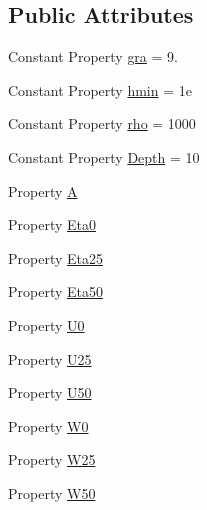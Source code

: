 \subsection*{Public Attributes}
\begin{DoxyCompactItemize}
\item 
Constant Property \hyperlink{class_nonhydrostatic_solitary_wave_a37f0468086327d90fba63bba4e2479bd}{gra} = 9.
\item 
Constant Property \hyperlink{class_nonhydrostatic_solitary_wave_aedba80f2b2bf3bb88a2dbe65acd50a8c}{hmin} = 1e
\item 
Constant Property \hyperlink{class_nonhydrostatic_solitary_wave_a37a61713a65b4f5613275f0698667743}{rho} = 1000
\item 
Constant Property \hyperlink{class_nonhydrostatic_solitary_wave_a781465fb7b097e42b93a05e9900a34fc}{Depth} = 10
\item 
Property \hyperlink{class_nonhydrostatic_solitary_wave_aa29acc0711e31c9bea232ca15aaf6bb0}{A}
\item 
Property \hyperlink{class_nonhydrostatic_solitary_wave_aacf571c090dcb2b8f3cf415b2f3c9ac5}{Eta0}
\item 
Property \hyperlink{class_nonhydrostatic_solitary_wave_a7a68533e4d5af739b62c6c492c9d734a}{Eta25}
\item 
Property \hyperlink{class_nonhydrostatic_solitary_wave_a33fb2694b0dab9bcba9ab40ce13c6592}{Eta50}
\item 
Property \hyperlink{class_nonhydrostatic_solitary_wave_a3eab97f8c42fa2ef3ed8a6c4ff6480e8}{U0}
\item 
Property \hyperlink{class_nonhydrostatic_solitary_wave_afed14b7ec596c08892be5baeb7a7d452}{U25}
\item 
Property \hyperlink{class_nonhydrostatic_solitary_wave_af8e624222892286e29048616b314e608}{U50}
\item 
Property \hyperlink{class_nonhydrostatic_solitary_wave_a7540838ae1877fbcf2999266444fae30}{W0}
\item 
Property \hyperlink{class_nonhydrostatic_solitary_wave_ab248794c0f19cbe94ee898e76ac74ee5}{W25}
\item 
Property \hyperlink{class_nonhydrostatic_solitary_wave_a924166bee67299f3a6420ad2534a4d70}{W50}
\end{DoxyCompactItemize}

